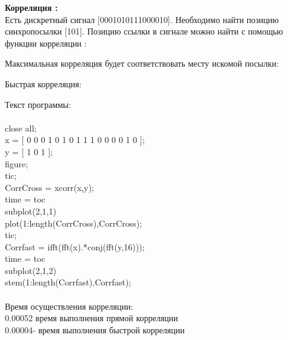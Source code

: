 \documentclass[12pt,a4paper]{scrartcl}
\begin{document}
\textbf{Корреляция :\\}
Есть дискретный сигнал [0001010111000010]. Необходимо найти позицию синхропосылки [101].
Позицию ссылки в сигнале можно найти с помощью функции корреляции : 
\begin{figure}[h!]
\end{figure}
\newpage
Максимальная корреляция будет соответствовать месту искомой посылки:
\begin{figure}[h!]
\end{figure}

Быстрая корреляция:
\begin{figure}[h!]
\end{figure}

Текст программы:\\
\\
close all;\\
x = [ 0 0 0 1 0 1 0 1 1 1 0 0 0 0 1 0 ];\\
y = [ 1 0 1 ];\\
figure;\\
tic;\\
CorrCross = xcorr(x,y);\\
time = toc\\
subplot(2,1,1)\\
plot(1:length(CorrCross),CorrCross);\\
tic;\\
Corrfast = ifft(fft(x).*conj(fft(y,16)));\\
time = toc\\
subplot(2,1,2)\\
stem(1:length(Corrfast),Corrfast);\\
\\

Время осуществления корреляции:\\  
0.00052 время выполнения прямой корреляции \\
0.00004- время выполнения быстрой корреляции \\
\end{document}
